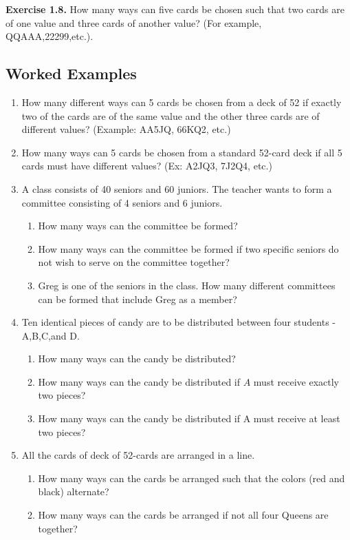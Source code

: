 \documentclass[
  12pt,
]{krantzNoCorner}
\providecommand{\tightlist}{%
  \setlength{\itemsep}{0pt}\setlength{\parskip}{0pt}}
\begin{document}
\textbf{Exercise 1.8.} How many ways can five cards be chosen such that two
cards are of one value and three cards of another value? (For example,
QQAAA,22299,etc.).

\hypertarget{worked-examples}{%
\subsection{Worked Examples}\label{worked-examples}}

\begin{enumerate}
\def\labelenumi{\arabic{enumi}.}
\item
  How many different ways can 5 cards be chosen from a deck of 52 if
  exactly two of the cards are of the same value and the other three
  cards are of different values? (Example: AA5JQ, 66KQ2, etc.)
\item
  How many ways can 5 cards be chosen from a standard 52-card deck if
  all 5 cards must have different values? (Ex: A2JQ3, 7J2Q4, etc.)
\item
  A class consists of 40 seniors and 60 juniors. The teacher wants to
  form a committee consisting of 4 seniors and 6 juniors.

  \begin{enumerate}
  \def\labelenumii{\alph{enumii}.}
  \tightlist
  \item
    How many ways can the committee be formed?
  \item
    How many ways can the committee be formed if two specific
    seniors do not wish to serve on the committee together?
  \item
    Greg is one of the seniors in the class. How many different
    committees can be formed that include Greg as a member?
  \end{enumerate}
\item
  Ten identical pieces of candy are to be distributed between four
  students - A,B,C,and D.

  \begin{enumerate}
  \def\labelenumii{\alph{enumii}.}
  \tightlist
  \item
    How many ways can the candy be distributed?
  \item
    How many ways can the candy be distributed if \(A\) must receive
    exactly two pieces?
  \item
    How many ways can the candy be distributed if A must receive at
    least two pieces?
  \end{enumerate}
\item
  All the cards of deck of 52-cards are arranged in a line.

  \begin{enumerate}
  \def\labelenumii{\alph{enumii}.}
  \tightlist
  \item
    How many ways can the cards be arranged such that the colors
    (red and black) alternate?
  \item
    How many ways can the cards be arranged if not all four Queens
    are together?
  \end{enumerate}
\end{enumerate}
\end{document}

